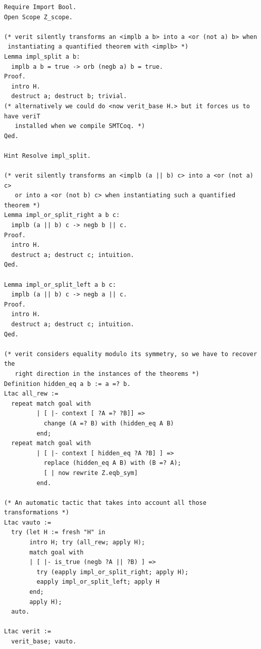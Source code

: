 \documentclass[11pt]{article}
\begin{document}
\lstset{language=coq}
\begin{lstlisting}[frame=single]
Require Import Bool.
Open Scope Z_scope.

(* verit silently transforms an <implb a b> into a <or (not a) b> when
 instantiating a quantified theorem with <implb> *)
Lemma impl_split a b:
  implb a b = true -> orb (negb a) b = true.
Proof.
  intro H.
  destruct a; destruct b; trivial.
(* alternatively we could do <now verit_base H.> but it forces us to have veriT
   installed when we compile SMTCoq. *)
Qed.

Hint Resolve impl_split.

(* verit silently transforms an <implb (a || b) c> into a <or (not a) c> 
   or into a <or (not b) c> when instantiating such a quantified theorem *)
Lemma impl_or_split_right a b c:
  implb (a || b) c -> negb b || c.
Proof.
  intro H.
  destruct a; destruct c; intuition. 
Qed.

Lemma impl_or_split_left a b c:
  implb (a || b) c -> negb a || c.
Proof.
  intro H.
  destruct a; destruct c; intuition.
Qed.

(* verit considers equality modulo its symmetry, so we have to recover the
   right direction in the instances of the theorems *)
Definition hidden_eq a b := a =? b.
Ltac all_rew :=
  repeat match goal with
         | [ |- context [ ?A =? ?B]] =>
           change (A =? B) with (hidden_eq A B)
         end;
  repeat match goal with
         | [ |- context [ hidden_eq ?A ?B] ] =>
           replace (hidden_eq A B) with (B =? A);
           [ | now rewrite Z.eqb_sym]
         end.

(* An automatic tactic that takes into account all those transformations *)
Ltac vauto :=
  try (let H := fresh "H" in
       intro H; try (all_rew; apply H);
       match goal with
       | [ |- is_true (negb ?A || ?B) ] =>
         try (eapply impl_or_split_right; apply H);
         eapply impl_or_split_left; apply H
       end;
       apply H);
  auto.

Ltac verit :=
  verit_base; vauto.
\end{lstlisting}
\end{document}
